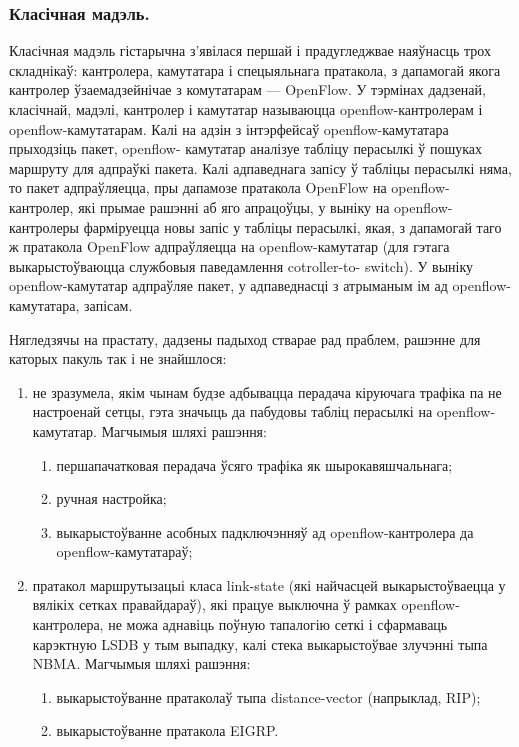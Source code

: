 \subsubsection{Класічная мадэль.}
Класічная мадэль гістарычна з'явілася першай і прадугледжвае наяўнасць трох складнікаў: кантролера, камутатара і спецыяльнага пратакола, з дапамогай якога кантролер ўзаемадзейнічае з комутатарам --- OpenFlow.
У тэрмінах дадзенай, класічнай, мадэлі, кантролер і камутатар
называюцца openflow-кантролерам і openflow-камутатарам.
Калі на адзін з інтэрфейсаў openflow-камутатара прыходзіць пакет, openflow-
камутатар аналізуе табліцу перасылкі ў пошуках маршруту для адпраўкі пакета.
Калі адпаведнага запiсу ў табліцы перасылкі няма, то пакет адпраўляецца, пры дапамозе пратакола OpenFlow на openflow-кантролер, які прымае рашэнні аб
яго апрацоўцы, у выніку на openflow-кантролеры фарміруецца новы запіс у табліцы перасылкі, якая, з дапамогай таго ж пратакола OpenFlow адпраўляецца на
openflow-камутатар (для гэтага выкарыстоўваюцца службовыя паведамлення cotroller-to-
switch). У выніку openflow-камутатар адпраўляе пакет, у адпаведнасці з атрыманым ім ад openflow-камутатара, запісам.

Нягледзячы на прастату, дадзены падыход стварае рад праблем, рашэнне для каторых
пакуль так і не знайшлося:
\begin{enumerate}
    \item не зразумела, якім чынам будзе адбывацца перадача кіруючага трафіка па
    не настроенай сетцы, гэта значыць да пабудовы табліц перасылкі на openflow-камутатар. Магчымыя шляхі рашэння:
    \begin{enumerate}
        \item першапачатковая перадача ўсяго трафіка як шырокавяшчальнага;
        \item ручная настройка;
        \item выкарыстоўванне асобных падключэнняў ад openflow-кантролера да openflow-камутатараў;
    \end{enumerate}
    \item пратакол маршрутызацыі класа link-state (які найчасцей выкарыстоўваецца у вялікіх сетках правайдараў), які працуе выключна ў рамках openflow-кантролера, не можа
    аднавіць поўную тапалогію сеткі і сфармаваць карэктную LSDB у тым выпадку,
    калі стека выкарыстоўвае злучэнні тыпа NBMA. Магчымыя шляхі рашэння:
        \begin{enumerate}
            \item выкарыстоўванне пратаколаў тыпа distance-vector (напрыклад, RIP);
            \item выкарыстоўванне пратакола EIGRP.
        \end{enumerate}
\end{enumerate}


